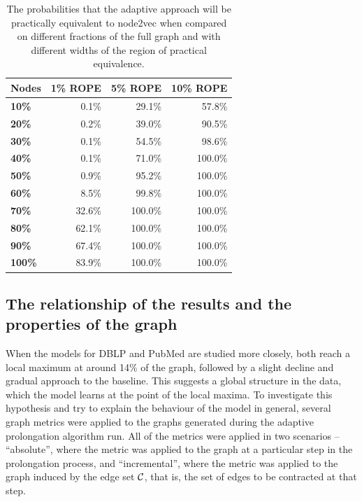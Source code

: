 \begin{table}
  \caption{The probabilities that the adaptive approach will be practically equivalent to node2vec when compared on different fractions of the full graph and with different widths of the region of practical equivalence.}
  \label{tab:bayesian-adaptive}
  \centering
  \begin{tabular}{lrrr}
    \toprule
    \textbf{Nodes} & \textbf{1\% ROPE} & \textbf{5\% ROPE} & \textbf{10\% ROPE} \\
    \midrule
    \textbf{10\%}  & 0.1\%             & 29.1\%            & 57.8\%             \\
    \textbf{20\%}  & 0.2\%             & 39.0\%            & 90.5\%             \\
    \textbf{30\%}  & 0.1\%             & 54.5\%            & 98.6\%             \\
    \textbf{40\%}  & 0.1\%             & 71.0\%            & 100.0\%            \\
    \textbf{50\%}  & 0.9\%             & 95.2\%            & 100.0\%            \\
    \textbf{60\%}  & 8.5\%             & 99.8\%            & 100.0\%            \\
    \textbf{70\%}  & 32.6\%            & 100.0\%           & 100.0\%            \\
    \textbf{80\%}  & 62.1\%            & 100.0\%           & 100.0\%            \\
    \textbf{90\%}  & 67.4\%            & 100.0\%           & 100.0\%            \\
    \textbf{100\%} & 83.9\%            & 100.0\%           & 100.0\%            \\
    \bottomrule
  \end{tabular}
\end{table}

\subsection{The relationship of the results and the properties of the graph}

When the models for DBLP and PubMed are studied more closely, both reach a local maximum at around 14\% of the graph, followed by a slight decline and gradual approach to the baseline. This suggests a global structure in the data, which the model learns at the point of the local maxima. To investigate this hypothesis and try to explain the behaviour of the model in general, several graph metrics were applied to the graphs generated during the adaptive prolongation algorithm run. All of the metrics were applied in two scenarios -- \enquote{absolute}, where the metric was applied to the graph at a particular step in the prolongation process, and \enquote{incremental}, where the metric was applied to the graph induced by the edge set \( \mathcal{C} \), that is, the set of edges to be contracted at that step.

